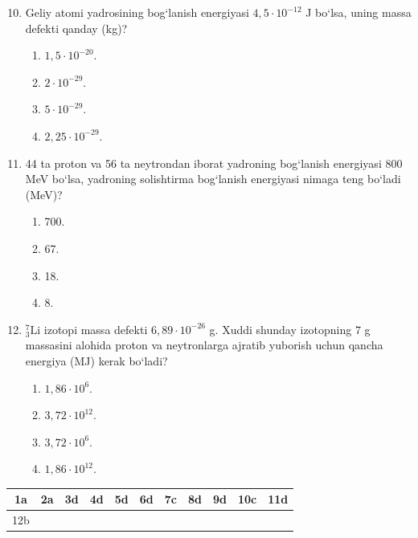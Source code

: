 \begin{enumerate}
\setcounter{enumi}{9}
\item Geliy atomi yadrosining bog‘lanish energiyasi $4,5\cdot 10^{-12}$ J bo‘lsa, uning massa defekti qanday (kg)?
\begin{enumerate}[label=\Alph*)]
\item $1,5\cdot 10^{-20}$.
\item $2\cdot 10^{-29}$.
\item $5\cdot 10^{-29}$.
\item $2,25\cdot 10^{-29}$.
\end{enumerate}

\item 44 ta proton va 56 ta neytrondan iborat yadroning bog‘lanish energiyasi 800 MeV bo‘lsa, yadroning solishtirma bog‘lanish energiyasi nimaga teng bo‘ladi (MeV)?
\begin{enumerate}[label=\Alph*)]
\item 700.
\item 67.
\item 18.
\item 8.
\end{enumerate}

\item $^7_3\text{Li}$ izotopi massa defekti $6,89\cdot 10^{-26}$ g. Xuddi shunday izotopning 7 g massasini alohida proton va neytronlarga ajratib yuborish uchun qancha energiya (MJ) kerak bo‘ladi?
\begin{enumerate}[label=\Alph*)]
\item $1,86\cdot 10^6$.
\item $3,72\cdot 10^{12}$.
\item $3,72\cdot 10^6$.
\item $1,86\cdot 10^{12}$.
\end{enumerate}

\end{enumerate}





\begin{table}[!ht]
\centering
\begin{tabular}{|c|c|c|c|c|c|c|c|c|c|c|}
\hline
1a & 2a & 3d & 4d & 5d & 6d & 7c & 8d & 9d & 10c & 11d \\ \hline
12b & & & & & & & & & & \\ \hline
\end{tabular}
\end{table}